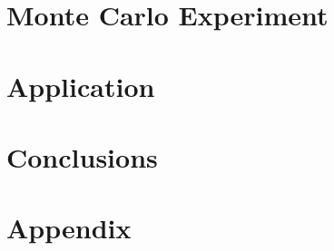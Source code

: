 \documentclass[english]{article}
\begin{document}

\section*{Monte Carlo Experiment}
\label{sec: mce}


\section*{Application}
\label{sec: app}


\section*{Conclusions}
\label{sec: conc}


\newpage
\cleardoublepage
\singlespacing




\newpage


\newpage
\doublespacing
\section*{Appendix}
\end{document}
